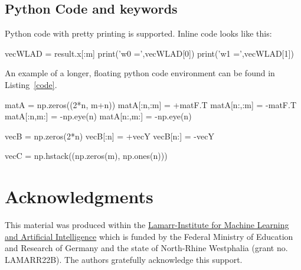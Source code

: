 \documentclass[fleqn,svgnames]{lamarrreport}
\begin{document}
\subsection{Python Code and keywords}

Python code with pretty printing is supported. 
Inline code looks like this:
\begin{pythontxt}
vecWLAD = result.x[:m]
print('w0 =',vecWLAD[0])
print('w1 =',vecWLAD[1])
\end{pythontxt}

An example of a longer, floating python code environment can be found in Listing~\ref{code}.


\begin{python}[float=t!, caption={setting up a linear programming problem}, label={code}, emph={}, numbers=left, numbersep=5pt]
matA = np.zeros((2*n, m+n))
matA[:n,:m] = +matF.T
matA[n:,:m] = -matF.T
matA[:n,m:] = -np.eye(n)
matA[n:,m:] = -np.eye(n)

vecB = np.zeros(2*n)
vecB[:n] = +vecY
vecB[n:] = -vecY

vecC = np.hstack((np.zeros(m), np.ones(n)))
\end{python}


\section*{Acknowledgments} %

This material was produced within the \href{https://lamarr-institute.org/}{Lamarr-Institute for Machine Learning and Artificial Intelligence} which is funded by the Federal Ministry of Education and Research of Germany and the state of North-Rhine Westphalia (grant no. LAMARR22B). The authors gratefully acknowledge this support.





\end{document}
